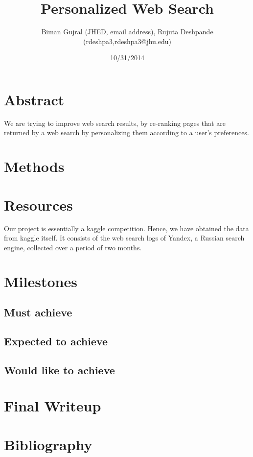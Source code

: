\documentclass[11pt]{article}
\title{Personalized Web Search}
\author{Biman Gujral (JHED, email address), Rujuta Deshpande (rdeshpa3,rdeshpa3@jhu.edu)}
\date{10/31/2014}
\begin{document}
\maketitle

\section{Abstract}
We are trying to improve web search results, by re-ranking pages that are returned by a web search by personalizing them according to a user's preferences. %


\section{Methods}

\section{Resources}
Our project is essentially a kaggle competition. Hence, we have obtained the data from kaggle itself. It consists of the web search logs of Yandex, a Russian search engine, collected over a period of two months. \newline
\section{Milestones}
\subsection{Must achieve}
\subsection{Expected to achieve}
\subsection{Would like to achieve}

\section{Final Writeup}

\section{Bibliography}
\end{document}
